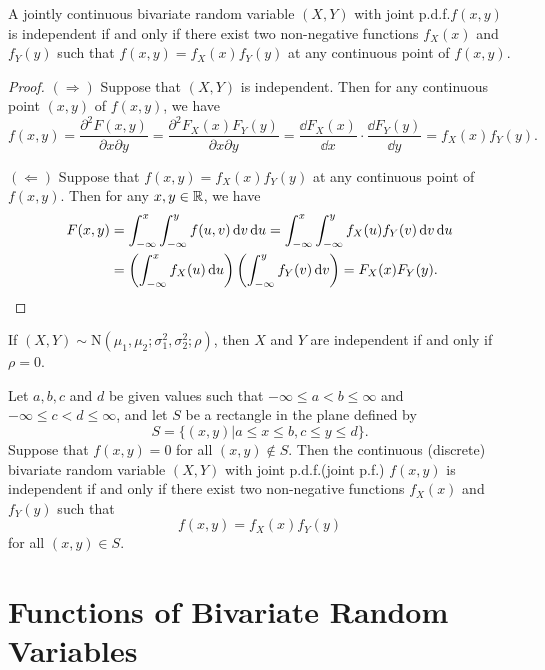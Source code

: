 \begin{proposition}
  A jointly continuous bivariate random variable \((X, Y)\) with joint p.d.f.\@ \(f(x, y)\) is independent if and only if there exist two non-negative functions \(f_X(x)\) and \(f_Y(y)\) such that \(f(x, y) = f_X(x) f_Y(y)\) at any continuous point of \(f(x, y)\).
\end{proposition}
\begin{proof}
  \((\Rightarrow)\) Suppose that \((X, Y)\) is independent. Then for any continuous point \((x, y)\) of \(f(x, y)\), we have
  \[
    f(x, y) = \frac{\partial^2 F(x, y)}{\partial x \partial y} = \frac{\partial^2 F_X(x) F_Y(y)}{\partial x \partial y} = \frac{\dd F_X(x)}{\dd x} \cdot \frac{\dd F_Y(y)}{\dd y} = f_X(x) f_Y(y).
  \]

  \((\Leftarrow)\) Suppose that \(f(x, y) = f_X(x) f_Y(y)\) at any continuous point of \(f(x, y)\). Then for any \(x, y \in \mathbb{R}\), we have
  \begin{align*}
    F(x, y) &= \int_{-\infty}^x \int_{-\infty}^y f(u, v) \, \mathrm{d} v \, \mathrm{d} u = \int_{-\infty}^x \int_{-\infty}^y f_X(u) f_Y(v) \, \mathrm{d} v \, \mathrm{d} u \\
    &= \left(\int_{-\infty}^x f_X(u) \, \mathrm{d} u\right) \left(\int_{-\infty}^y f_Y(v) \, \mathrm{d} v\right) = F_X(x) F_Y(y). \qedhere
  \end{align*}
\end{proof}

\begin{proposition}
  If \((X, Y) \sim \mathrm{N}(\mu_1, \mu_2; \sigma_1^2, \sigma_2^2; \rho)\), then \(X\) and \(Y\) are independent if and only if \(\rho = 0\).
\end{proposition}

\begin{theorem}
  Let \(a, b, c\) and \(d\) be given values such that \(-\infty \leq a < b \leq \infty\) and \(-\infty \leq c < d \leq \infty\), and let \(S\) be a rectangle in the plane defined by
  \[
   S = \{(x, y) | a \leq x \leq b, c \leq y \leq d\}.
  \]
  Suppose that \(f(x, y) = 0\) for all \((x, y) \notin S\). Then the continuous (discrete) bivariate random variable \((X, Y)\) with joint p.d.f.\@ (joint p.f.\@) \(f(x, y)\) is independent if and only if there exist two non-negative functions \(f_X(x)\) and \(f_Y(y)\) such that
  \[
    f(x, y) = f_X(x) f_Y(y)
  \]
  for all \((x, y) \in S\).
\end{theorem}

\section{Functions of Bivariate Random Variables}

